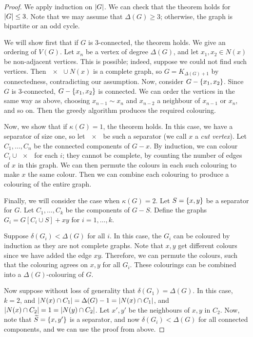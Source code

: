\begin{proof}
	We apply induction on \( \abs{G} \).
	We can check that the theorem holds for \( \abs{G} \leq 3 \).
	Note that we may assume that \( \Delta(G) \geq 3 \); otherwise, the graph is bipartite or an odd cycle.

	We will show first that if \( G \) is 3-connected, the theorem holds.
	We give an ordering of \( V(G) \).
	Let \( x_n \) be a vertex of degree \( \Delta(G) \), and let \( x_1, x_2 \in N(x) \) be non-adjacent vertices.
	This is possible; indeed, suppose we could not find such vertices.
	Then \( \qty{x} \cup N(x) \) is a complete graph, so \( G = K_{\Delta(G) + 1} \) by connectedness, contradicting our assumption.
	Now, consider \( G - \qty{x_1, x_2} \).
	Since \( G \) is 3-connected, \( G - \qty{x_1,x_2} \) is connected.
	We can order the vertices in the same way as above, choosing \( x_{n-1} \sim x_n \) and \( x_{n-2} \) a neighbour of \( x_{n-1} \) or \( x_n \), and so on.
	Then the greedy algorithm produces the required colouring.

	Now, we show that if \( \kappa(G) = 1 \), the theorem holds.
	In this case, we have a separator of size one, so let \( \qty{x} \) be such a separator (we call \( x \) a \emph{cut vertex}).
	Let \( C_1, \dots, C_n \) be the connected components of \( G - x \).
	By induction, we can colour \( C_i \cup \qty{x} \) for each \( i \); they cannot be complete, by counting the number of edges of \( x \) in this graph.
	We can then permute the colours in each such colouring to make \( x \) the same colour.
	Then we can combine each colouring to produce a colouring of the entire graph.

	Finally, we will consider the case when \( \kappa(G) = 2 \).
	Let \( S = \qty{x,y} \) be a separator for \( G \).
	Let \( C_1, \dots, C_k \) be the components of \( G - S \).
	Define the graphs \( G_i = G[C_i \cup S] + xy \) for \( i = 1, \dots, k \).

	Suppose \( \delta(G_i) < \Delta(G) \) for all \( i \).
	In this case, the \( G_i \) can be coloured by induction as they are not complete graphs.
	Note that \( x, y \) get different colours since we have added the edge \( xy \).
	Therefore, we can permute the colours, such that the colouring agrees on \( x,y \) for all \( G_i \).
	These colourings can be combined into a \( \Delta(G) \)-colouring of \( G \).

	Now suppose without loss of generality that \( \delta(G_1) = \Delta(G) \).
	In this case, \( k = 2 \), and \( \abs{N(x) \cap C_1} = \Delta(G) - 1 = \abs{N(x) \cap C_1} \), and \( \abs{N(x) \cap C_2} = 1 = \abs{N(y) \cap C_2} \).
	Let \( x', y' \) be the neighbours of \( x, y \) in \( C_2 \).
	Now, note that \( \widetilde S = \qty{x,y'} \) is a separator, and now \( \delta(G_i) < \Delta(G) \) for all connected components, and we can use the proof from above.
\end{proof}

